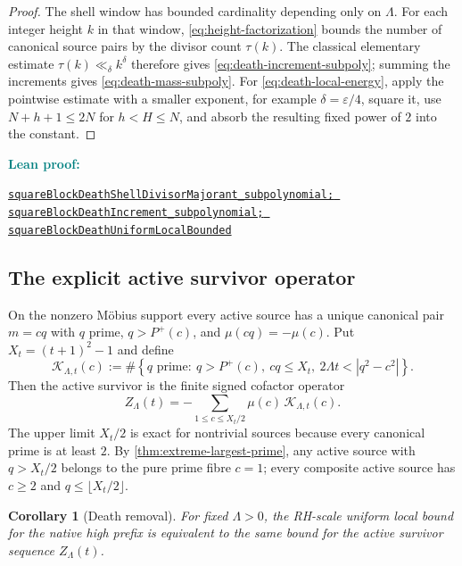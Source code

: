 \documentclass[11pt]{article}
\newtheorem{corollary}[theorem]{Corollary}
\theoremstyle{definition}
\newcommand{\eps}{\varepsilon}
\newcommand{\Pplus}{P^{+}}
\newcommand{\1}{\mathbf{1}}
\newcommand{\leanxref}[3]{%
  \par\smallskip
  {\small\noindent\textcolor{teal}{\textbf{#1:}}\par
  \noindent\href{#3}{\nolinkurl{#2}}\par}
  \smallskip
}
\begin{document}
\begin{proof}
The shell window has bounded cardinality depending only on $\Lambda$.  For each integer height $k$ in that window, \cref{eq:height-factorization} bounds the number of canonical source pairs by the divisor count $\tau(k)$.  The classical elementary estimate $\tau(k)\ll_\delta k^\delta$ therefore gives \cref{eq:death-increment-subpoly}; summing the increments gives \cref{eq:death-mass-subpoly}.  For \cref{eq:death-local-energy}, apply the pointwise estimate with a smaller exponent, for example $\delta=\eps/4$, square it, use $N+h+1\le2N$ for $h<H\le N$, and absorb the resulting fixed power of $2$ into the constant.
\end{proof}
\leanxref{Lean proof}{squareBlockDeathShellDivisorMajorant_subpolynomial; squareBlockDeathIncrement_subpolynomial; squareBlockDeathUniformLocalBounded}{https://github.com/OVVO-Financial/square-block-mobius/blob/main/lean/RHLean/Analysis/SquareBlockDeathProcess.lean}

\subsection{The explicit active survivor operator}

On the nonzero M\"obius support every active source has a unique canonical pair $m=cq$ with $q$ prime, $q>\Pplus(c)$, and $\mu(cq)=-\mu(c)$.  Put $X_t=(t+1)^2-1$ and define
\begin{equation}
 \mathcal K_{\Lambda,t}(c)
 :=\#\left\{
 q\text{ prime}:\
 q>\Pplus(c),\ cq\le X_t,\ 2\Lambda t<|q^2-c^2|
 \right\}.
 \label{eq:survivor-kernel}
\end{equation}
Then the active survivor is the finite signed cofactor operator
\begin{equation}
 \boxed{
 Z_\Lambda(t)
 =-\sum_{1\le c\le X_t/2}\mu(c)\,\mathcal K_{\Lambda,t}(c).
 }
 \label{eq:survivor-zero-mode}
\end{equation}
The upper limit $X_t/2$ is exact for nontrivial sources because every canonical prime is at least $2$.  By \cref{thm:extreme-largest-prime}, any active source with $q>X_t/2$ belongs to the pure prime fibre $c=1$; every composite active source has $c\ge2$ and $q\le\lfloor X_t/2\rfloor$.

\begin{corollary}[Death removal]
\label{cor:death-removal}
For fixed $\Lambda>0$, the RH-scale uniform local bound for the native high prefix is equivalent to the same bound for the active survivor sequence $Z_\Lambda(t)$.
\end{corollary}
\end{document}
